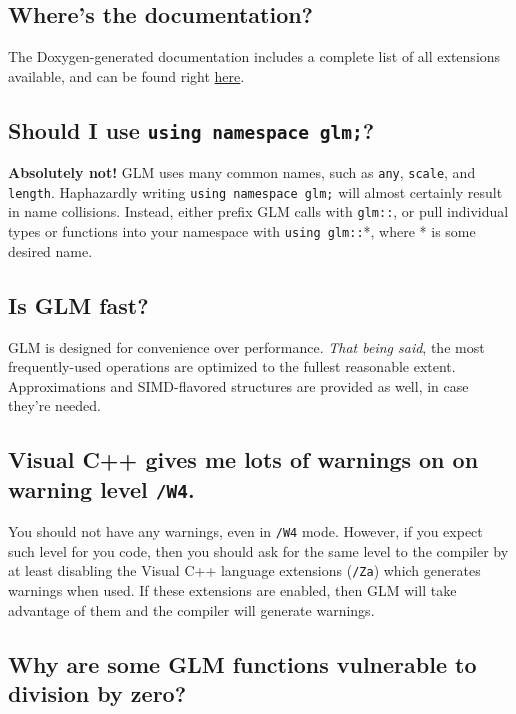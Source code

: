 \documentclass{scrartcl}
\numberwithin{figure}{subsection}
\begin{document}
\subsection{Where's the documentation?}

The Doxygen-generated documentation includes a complete list of all extensions available, and can be found right \href{http://glm.g-truc.net/html/index.html}{here}.

\subsection{Should I use \texttt{using namespace glm;}?}

\textbf{Absolutely not!}  GLM uses many common names, such as \verb|any|, \verb|scale|, and \verb|length|.  Haphazardly writing \verb|using namespace glm;| will almost certainly result in name collisions.  Instead, either prefix GLM calls with \verb|glm::|, or pull individual types or functions into your namespace with \verb|using glm::|*, where * is some desired name.

\subsection{Is GLM fast?}

GLM is designed for convenience over performance.  \emph{That being said}, the most frequently-used operations are optimized to the fullest reasonable extent.  Approximations and SIMD-flavored structures are provided as well, in case they're needed.

\subsection{Visual C++ gives me lots of warnings on on warning level \texttt{/W4}.}

You should not have any warnings, even in \verb|/W4| mode. However, if you expect such level for you code, then you should ask for the same level to the compiler by at least disabling the Visual C++ language extensions (\verb|/Za|) which generates warnings when used. If these extensions are enabled, then GLM will take advantage of them and the compiler will generate warnings.

\subsection{Why are some GLM functions vulnerable to division by zero?}
\end{document}
